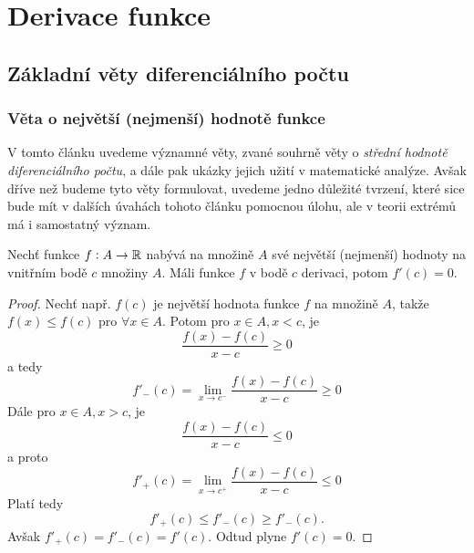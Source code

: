 \chapter{Derivace funkce}\label{mai:IchapIV}
\minitoc

  \section{Základní věty diferenciálního počtu}
    \subsection{Věta o největší (nejmenší) hodnotě funkce}
      V tomto článku uvedeme významné věty, zvané souhrně věty o \emph{střední hodnotě 
      diferenciálního počtu}, a dále pak ukázky jejich užití v matematické analýze.  Avšak dříve 
      než budeme tyto věty formulovat, uvedeme jedno důležité tvrzení, které sice bude mít v 
      dalších úvahách tohoto článku pomocnou úlohu, ale v teorii extrémů má i samostatný význam. 
      \cite[s.~186]{Brabec1989} 
      \begin{lemma}\label{MA1:lem_diff02}
        Nechť funkce $f:A\rightarrow\mathbb{R}$ nabývá na množině $A$ své největší (nejmenší) hodnoty 
        na vnitřním bodě $c$ množiny $A$. Máli funkce $f$ v bodě $c$ derivaci, potom $f'(c)=0$.  
      \end{lemma}
      \begin{proof}
        Nechť např. $f(c)$ je největší hodnota funkce $f$ na množině $A$, takže $f(x)\leq f(c)$ pro $\forall x\in A$. Potom pro $x\in A, x<c$, je 
        $$\frac{f(x)-f(c)}{x-c}\geq 0$$
        a tedy
        $$f'_{-}(c)=\lim_{x\rightarrow c^-}\frac{f(x)-f(c)}{x-c}\geq0$$ 
        Dále pro $x\in A, x>c$, je
        $$\frac{f(x)-f(c)}{x-c}\leq 0$$ 
        a proto
        $$f'_{+}(c)=\lim_{x\rightarrow c^+}\frac{f(x)-f(c)}{x-c}\leq0$$
        Platí tedy
        $$f'_{+}(c)\leq f'_{-}(c)\geq f'_{-}(c).$$ 
        Avšak $f'_{+}(c)=f'_{-}(c)= f'(c)$. Odtud plyne $f'(c)=0$. 
      \end{proof}
      
